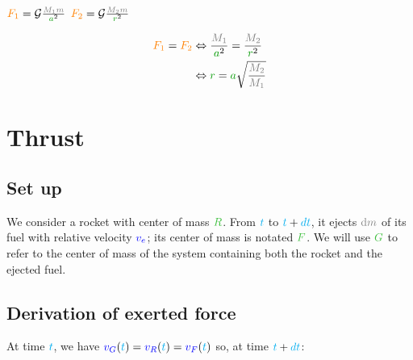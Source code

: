 $\force{F_1} = \mathcal G \frac {\mass{M_1} \mass{m}} {\dist{a}^2}$
$\force{F_2} = \mathcal G \frac {\mass{M_2} \mass{m}} {\dist{r}^2}$

\begin{align*}
\force{F_1} = \force{F_2}
& \Leftrightarrow \frac {\mass{M_1}} {\dist{a}^2} = \frac {\mass{M_2}} {\dist{r}^2} \\
& \Leftrightarrow \dist{r} = \dist{a} \sqrt{\frac {\mass{M_2}} {\mass{M_1}}} \\
\end{align*}



\section{Thrust}


\subsection{Set up}

We consider a rocket with center of mass $\posit{R}$. From $\textcolor{cyan}{t}$ to
$\textcolor{cyan}{t}+\textcolor{cyan}{dt}$, it ejects $\mass{\dm}$ of its fuel with relative
velocity $\textcolor{blue}{v_e}$; its center of mass is notated $\posit{F}$. We will
use $\posit{G}$ to refer to the center of mass of the system containing
both the rocket and the ejected fuel.


\subsection{Derivation of exerted force}

At time $\textcolor{cyan}{t}$, we have $\textcolor{blue}{v_G}(\textcolor{cyan}{t}) =
\textcolor{blue}{v_R}(\textcolor{cyan}{t}) = \textcolor{blue}{v_F}(\textcolor{cyan}{t})$ so, at time
$\textcolor{cyan}{t}+\textcolor{cyan}{dt}$:

